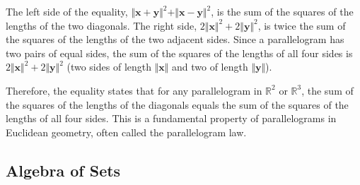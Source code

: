 \documentclass[10pt]{extarticle}
\begin{document}
\begin{solution}
    The left side of the equality, $\Vert\mathbf{x} + \mathbf{y}\Vert^2 + \Vert\mathbf{x} - \mathbf{y}\Vert^2$, is the sum of the squares of the lengths of the two diagonals. The right side, $2\Vert\mathbf{x}\Vert^2 + 2\Vert\mathbf{y}\Vert^2$, is twice the sum of the squares of the lengths of the two adjacent sides. Since a parallelogram has two pairs of equal sides, the sum of the squares of the lengths of all four sides is $2\Vert\mathbf{x}\Vert^2 + 2\Vert\mathbf{y}\Vert^2$ (two sides of length $\Vert\mathbf{x}\Vert$ and two of length $\Vert\mathbf{y}\Vert$).

    Therefore, the equality states that for any parallelogram in $\mathbb{R}^2$ or $\mathbb{R}^3$, the sum of the squares of the lengths of the diagonals equals the sum of the squares of the lengths of all four sides. This is a fundamental property of parallelograms in Euclidean geometry, often called the parallelogram law.
\end{solution}

\setcounter{subsection}{2}
\subsection{Algebra of Sets}
\end{document}
